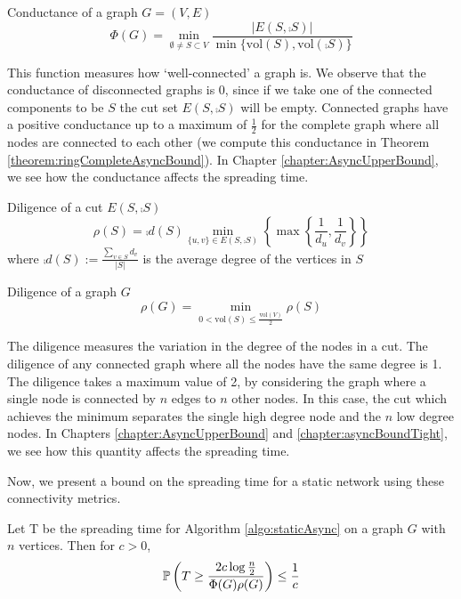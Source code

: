 \begin{definition}
	Conductance of a graph $G = (V, E)$
	$$
		\Phi(G) = \min_{\emptyset \neq S \subset V} \frac{|E(S, \comp{S})|}{\min\{\text{vol}(S), \text{vol}(\comp{S})\}}
	$$
\end{definition}

This function measures how `well-connected' a graph is. We observe that the conductance of disconnected graphs is 0, since if we take one of the connected components to be $S$ the cut set $E(S, \comp{S})$ will be empty. Connected graphs have a positive conductance up to a maximum of $\frac{1}{2}$ for the complete graph where all nodes are connected to each other (we compute this conductance in Theorem \ref{theorem:ringCompleteAsyncBound}). In Chapter \ref{chapter:AsyncUpperBound}, we see how the conductance affects the spreading time. 

\begin{definition}
	Diligence of a cut $ E(S, \comp{S}) $
	$$
		\rho(S) = \comp{d}(S) \min_{\{u, v\} \in E(S, \comp{S}) } \left\{ \max \left\{ \frac{1}{d_u},\frac{1}{d_v} \right\} \right\}
	$$ 
	where $\comp{d}(S) := \frac{\sum_{v \in S} d_v}{|S|}$ is the average degree of the vertices in $S$
\end{definition}

\begin{definition}
	Diligence of a graph $G$
	$$
		\rho(G) = \min_{0 < \text{vol}(S) \leq \frac{\text{vol}(V)}{2}} \rho(S) 
	$$
\end{definition}

The diligence measures the variation in the degree of the nodes in a cut. The diligence of any connected graph where all the nodes have the same degree is 1. The diligence takes a maximum value of 2, by considering the graph where a single node is connected by $n$ edges to $n$ other nodes. In this case, the cut which achieves the minimum separates the single high degree node and the $n$ low degree nodes. In Chapters \ref{chapter:AsyncUpperBound} and \ref{chapter:asyncBoundTight}, we see how this quantity affects the spreading time. 

Now, we present a bound on the spreading time for a static network using these connectivity metrics.

\begin{theorem}\label{theorem:staticBound}
	Let T be the spreading time for Algorithm \ref{algo:staticAsync} on a graph $G$ with $n$ vertices. Then for $c > 0$,
	$$
		\mathbb{P}\left( T \geq \frac{2c \log \frac{n}{2}}{\Phi(G)\rho(G)}\right) \leq \frac{1}{c}
	$$
\end{theorem}

